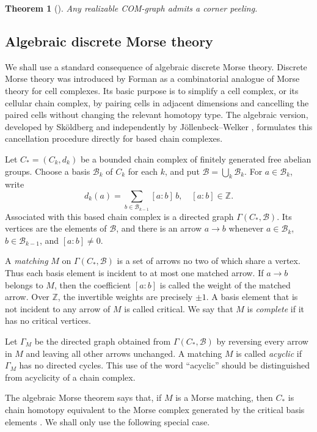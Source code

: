 \documentclass{amsart}
\numberwithin{equation}{section}
\newtheorem{thm}{Theorem}[section]
\theoremstyle{plain}
\theoremstyle{remark}
\theoremstyle{definition}
\numberwithin{equation}{section}
\begin{document}
\begin{thm}[{\cite[Proposition 5.5]{KM-corners}}]\label{thm:corner-peeling}
    Any realizable COM-graph admits a corner peeling.
\end{thm}

\subsection{Algebraic discrete Morse theory}

We shall use a standard consequence of algebraic discrete Morse theory.
Discrete Morse theory was introduced by Forman \cite{Forman} as a
combinatorial analogue of Morse theory for cell complexes. Its basic purpose is
to simplify a cell complex, or its cellular chain complex, by pairing cells in
adjacent dimensions and cancelling the paired cells without changing the
relevant homotopy type. The algebraic version, developed by Sköldberg and
independently by Jöllenbeck--Welker \cite{Skoldberg,JW}, formulates this
cancellation procedure directly for based chain complexes.

Let $C_*=(C_k,d_k)$ be a bounded chain complex of finitely generated free abelian
groups.
Choose a basis
$\mathcal B_k$ of $C_k$ for each $k$, and put
$\mathcal B=\bigcup_k \mathcal B_k$.
For $a\in \mathcal B_k$, write
\[
    d_k(a)=\sum_{b\in \mathcal B_{k-1}} [a:b]\,b,
    \quad [a:b]\in \mathbb Z .
\]
Associated with this based chain complex is a directed graph
$\Gamma(C_*,\mathcal B)$. Its vertices are the elements of $\mathcal B$, and
there is an arrow
$a\to b$
whenever $a\in \mathcal B_k$, $b\in \mathcal B_{k-1}$, and $[a:b]\neq 0$.

A \emph{matching} $M$ on $\Gamma(C_*,\mathcal B)$ is a set of arrows no two of
which share a vertex. Thus each basis element is incident to at most one
matched arrow. If $a\to b$ belongs to $M$, then the coefficient $[a:b]$ is
called the weight of the matched arrow. Over $\mathbb Z$, the invertible
weights are precisely $\pm 1$. A basis element that is not incident to any
arrow of $M$ is called critical. We say that $M$ is \emph{complete} if it has no
critical vertices.

Let $\Gamma_M$ be the directed graph obtained from
$\Gamma(C_*,\mathcal B)$ by reversing every arrow in $M$ and leaving all
other arrows unchanged. A matching $M$ is called \emph{acyclic} if $\Gamma_M$ has
no directed cycles. This use of the word ``acyclic'' should be distinguished
from acyclicity of a chain complex.

The algebraic Morse theorem says that, if $M$ is a Morse matching, then
$C_*$ is chain homotopy equivalent to the Morse complex generated by the
critical basis elements \cite[Theorem~1]{Skoldberg}. We shall only use the
following special case.
\end{document}
